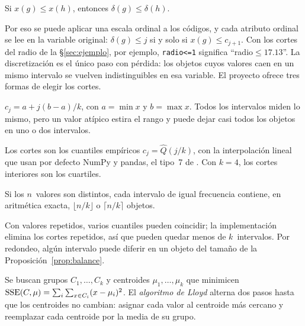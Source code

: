 \begin{proposicion}\label{prop:orden}
Si $x(g) \le x(h)$, entonces $\delta(g) \le \delta(h)$.
\end{proposicion}

Por eso se puede aplicar una escala ordinal a los códigos, y cada atributo ordinal se lee en la variable original: $\delta(g) \le j$ si y solo si $x(g) \le c_{j+1}$. Con los cortes del radio de la \S\ref{sec:ejemplo}, por ejemplo, \texttt{radio<=1} significa \enquote{radio${}\le 17.13$}. La discretización es el único paso con pérdida: los objetos cuyos valores caen en un mismo intervalo se vuelven indistinguibles en esa variable. El proyecto ofrece tres formas de elegir los cortes.

\begin{definicion}\label{def:ancho}
$c_j = a + j(b - a)/k$, con $a = \min x$ y $b = \max x$. Todos los intervalos miden lo mismo, pero un valor atípico estira el rango y puede dejar casi todos los objetos en uno o dos intervalos.
\end{definicion}

\begin{definicion}\label{def:frecuencia}
Los cortes son los cuantiles empíricos $c_j = \hat{Q}(j/k)$, con la interpolación lineal que usan por defecto NumPy y pandas, el tipo~7 de \textcite{hyndman1996}. Con $k = 4$, los cortes interiores son los cuartiles.
\end{definicion}

\begin{proposicion}\label{prop:balance}
Si los $n$~valores son distintos, cada intervalo de igual frecuencia contiene, en aritmética exacta, $\lfloor n/k \rfloor$ o $\lceil n/k \rceil$ objetos.
\end{proposicion}

\begin{observacion}[empates]\label{obs:empates}
Con valores repetidos, varios cuantiles pueden coincidir; la implementación elimina los cortes repetidos, así que pueden quedar menos de $k$~intervalos. Por redondeo, algún intervalo puede diferir en un objeto del tamaño de la Proposición~\ref{prop:balance}.
\end{observacion}

\begin{definicion}\label{def:kmedias}
Se buscan grupos $C_1, \dots, C_k$ y centroides $\mu_1, \dots, \mu_k$ que minimicen $\operatorname{SSE}(C, \mu) = \sum_{i} \sum_{x \in C_i} (x - \mu_i)^2$. El \emph{algoritmo de Lloyd} \parencite{lloyd1982} alterna dos pasos hasta que los centroides no cambian: asignar cada valor al centroide más cercano y reemplazar cada centroide por la media de su grupo.
\end{definicion}


